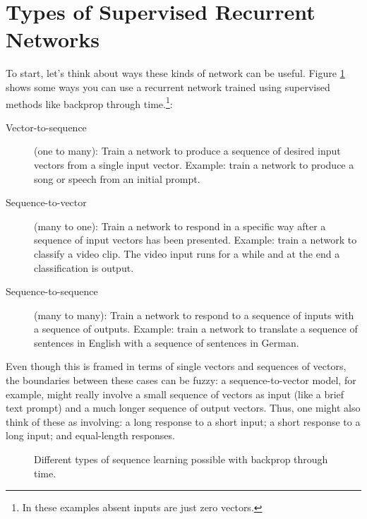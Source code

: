 \section{Types of Supervised Recurrent Networks}

To start, let's think about ways these kinds of network can be useful. Figure \ref{rnn_schema} shows some ways you can use a recurrent network trained using supervised methods like backprop through time.\footnote{In these examples absent inputs are just zero vectors.}:
\begin{description}
\item[Vector-to-sequence] (one to many):  Train a network to produce a sequence of desired input vectors from a single input vector. Example: train a network to produce a song or speech from an initial prompt.
\item[Sequence-to-vector] (many to one): Train a network to respond in a specific way after a sequence of input vectors has been presented. Example: train a network to classify a video clip. The video input runs for a while and at the end a classification is output.
\item[Sequence-to-sequence] (many to many): Train a network to respond to a sequence of inputs with a sequence of outputs. Example: train a network to translate a sequence of sentences in English with a sequence of sentences in German.
\end{description}
Even though this is framed in terms of single vectors and sequences of vectors, the boundaries between these cases can be fuzzy: a sequence-to-vector model, for example, might really involve a small sequence of vectors as input (like a brief text prompt) and a much longer sequence of output vectors. Thus, one might also think of these as involving: a long response to a short input; a short response to a long input; and equal-length responses.

\begin{figure}[h]
\centering
{}
\caption[Adapted from Karpathy, 2015 \cite{karpathy2015unreasonable}.]{Different types of sequence learning possible with backprop through time.}
\label{rnn_schema}
\end{figure}

